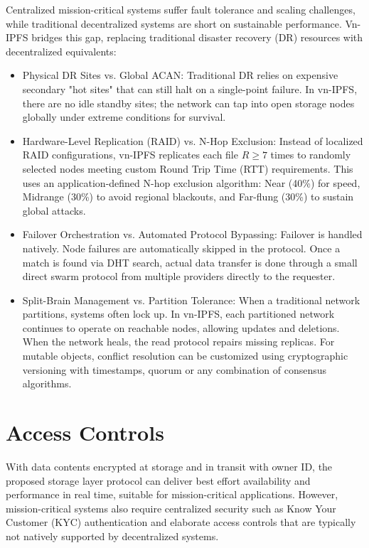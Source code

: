 \documentclass[conference]{IEEEtran}
\begin{document}
Centralized mission-critical systems suffer fault tolerance and scaling challenges, while traditional decentralized systems are short on sustainable performance. Vn-IPFS bridges this gap, replacing traditional disaster recovery (DR) resources with decentralized equivalents:
\begin{itemize}
    \item Physical DR Sites vs. Global ACAN: Traditional DR relies on expensive secondary "hot sites" that can still halt on a single-point failure. In vn-IPFS, there are no idle standby sites; the network can tap into open storage nodes globally under extreme conditions for survival.

    \item Hardware-Level Replication (RAID) vs. N-Hop Exclusion: Instead of localized RAID configurations, vn-IPFS replicates each file $R \ge 7$ times to randomly selected nodes meeting custom Round Trip Time (RTT) requirements. This uses an application-defined N-hop exclusion algorithm: Near (40\%) for speed, Midrange (30\%) to avoid regional blackouts, and Far-flung (30\%) to sustain global attacks.

    \item Failover Orchestration vs. Automated Protocol Bypassing: Failover is handled natively. Node failures are automatically skipped in the protocol. Once a match is found via DHT search, actual data transfer is done through a small direct swarm protocol from multiple providers directly to the requester.

    \item Split-Brain Management vs. Partition Tolerance: When a traditional network partitions, systems often lock up. In vn-IPFS, each partitioned network continues to operate on reachable nodes, allowing updates and deletions. When the network heals, the read protocol repairs missing replicas. For mutable objects, conflict resolution can be customized using cryptographic versioning with timestamps, quorum or any combination of consensus algorithms.
\end{itemize}

\section{Access Controls}

With data contents encrypted at storage and in transit with owner ID, the proposed storage layer protocol can deliver best effort availability and performance in real time, suitable for mission-critical applications. However, mission-critical systems also require centralized security such as Know Your Customer (KYC) authentication and elaborate access controls that are typically not natively supported by decentralized systems.
\end{document}
